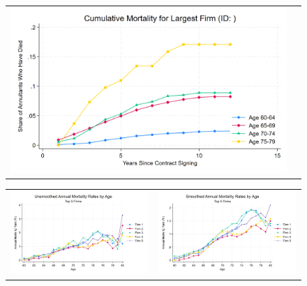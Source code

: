 \documentclass[12pt]{article}
\begin{document}
\newpage


  \begin{figure}[H]
\caption{}
 \label{fig:ie4_11}
\centering{}%
\begin{tabular}{cc}
\includegraphics[scale=0.27]{figures/IE4/IE4_mortality_curves_by_age.png} 
\end{tabular}
\end{figure} 


   \begin{figure}[H]
\caption{}
 \label{fig:ie4_11}
\centering{}%
\begin{tabular}{cc}
\includegraphics[scale=0.17]{figures/IE4/IE4_mortality_rates_unsmoothed.png} 
& \includegraphics[scale=0.17]{figures/IE4/IE4_mortality_rates_smoothed.png} 
\end{tabular}
\end{figure} 
 
\end{document}
